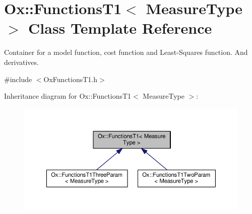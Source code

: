 \hypertarget{class_ox_1_1_functions_t1}{\section{Ox\-:\-:Functions\-T1$<$ Measure\-Type $>$ Class Template Reference}
\label{class_ox_1_1_functions_t1}
}


Container for a model function, cost function and Least-\/\-Squares function. And derivatives.  




{\ttfamily \#include $<$Ox\-Functions\-T1.\-h$>$}



Inheritance diagram for Ox\-:\-:Functions\-T1$<$ Measure\-Type $>$\-:
\nopagebreak
\begin{figure}[H]
\begin{center}
\leavevmode
\includegraphics[width=350pt]{class_ox_1_1_functions_t1__inherit__graph}
\end{center}
\end{figure}
